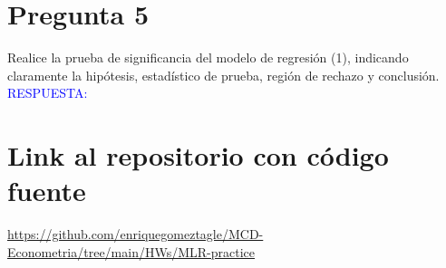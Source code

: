 \documentclass[10pt]{article}
\begin{document}
\section{Pregunta 5}
Realice la prueba de significancia del modelo de regresión (1), indicando claramente la hipótesis, estadístico de prueba, región de rechazo y conclusión. \\

\textcolor{blue}{RESPUESTA: }
\section{Link al repositorio con código fuente}
\url{https://github.com/enriquegomeztagle/MCD-Econometria/tree/main/HWs/MLR-practice}
\end{document}
